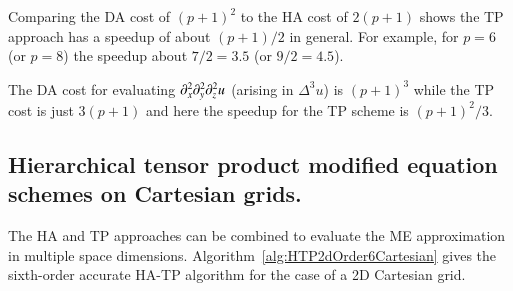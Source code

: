Comparing the DA cost of  $(p+1)^2$ to the HA cost of  $2(p+1)$ shows the TP approach
has a speedup of about  $(p+1)/2$ in general.
For example, 
for $p=6$ (or $p=8$) the speedup about $7/2=3.5$ (or $9/2=4.5$).

\mni
The DA cost for evaluating $\partial_x^2 \partial_y^2 \partial_z^2 u$ (arising in $\Delta^3 u$)  is $(p+1)^3$ while the TP cost is just $3(p+1)$
and here the speedup for the TP scheme is $(p+1)^2/3$.


\subsection{Hierarchical tensor product modified equation schemes on Cartesian grids.}

\bni
The HA and TP approaches can be combined to evaluate the ME approximation in multiple space dimensions.
Algorithm~\ref{alg:HTP2dOrder6Cartesian} gives the sixth-order accurate HA-TP algorithm for the case of a 2D Cartesian grid.

